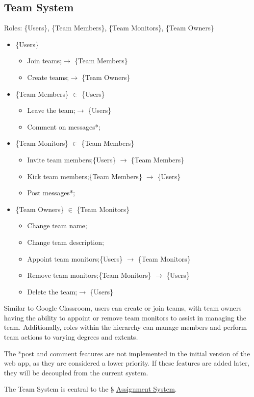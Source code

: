 \documentclass[12pt]{report}
\newcommand{\n}{\par}
\newcommand{\br}{\n\vspace{1 em}\n}
\begin{document}
\subsection{Team System} \label{overview.project-objectives.team-system}
Roles: \{Users\}, \{Team Members\}, \{Team Monitors\}, \{Team Owners\}\n
\begin{itemize}
	\item \{Users\}
	      \begin{itemize}
		      \item Join teams;\null\hfill $\rightarrow$ \{Team Members\}
		      \item Create teams;\null\hfill $\rightarrow$ \{Team Owners\}
	      \end{itemize}
	\item \{Team Members\} $\in$ \{Users\}
	      \begin{itemize}
		      \item Leave the team;\null\hfill $\rightarrow$ \{Users\}
		      \item Comment on messages*;
	      \end{itemize}
	\item \{Team Monitors\} $\in$ \{Team Members\}
	      \begin{itemize}
		      \item Invite team members;\null\hfill \{Users\} $\rightarrow$ \{Team Members\}
		      \item Kick team members;\null\hfill \{Team Members\} $\rightarrow$ \{Users\}
		      \item Post messages*;
	      \end{itemize}
	\item \{Team Owners\} $\in$ \{Team Monitors\}
	      \begin{itemize}
		      \item Change team name;
		      \item Change team description;
		      \item Appoint team monitors;\null\hfill \{Users\} $\rightarrow$ \{Team Monitors\}
		      \item Remove team monitors;\null\hfill \{Team Monitors\} $\rightarrow$ \{Users\}
		      \item Delete the team;\null\hfill $\rightarrow$ \{Users\}
	      \end{itemize}
\end{itemize}\n
Similar to Google Classroom, users can create or join teams,
with team owners having the ability to appoint or remove team monitors to assist in managing the team.
Additionally, roles within the hierarchy can manage members and perform team actions to varying degrees and extents.
\br
The *post and comment features are not implemented in the initial version of the web app, as they are considered a lower priority.
If these features are added later, they will be decoupled from the current system.
\br
The Team System is central to the \S{} \hyperref[overview.project-objectives.assignment-system]{Assignment System}.
\end{document}
